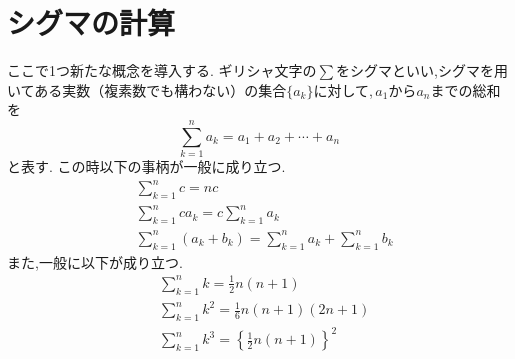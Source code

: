 
\section{シグマの計算}
  ここで1つ新たな概念を導入する.
  ギリシャ文字の$\sum$をシグマといい,シグマを用いてある実数（複素数でも構わない）の集合$\{a_k\}$に対して,\,$a_1$から$a_n$までの総和を
  \[
    \sum_{k=1}^{n} a_k=a_1+a_2+\cdots+ a_n
  \]
  と表す.
  この時以下の事柄が一般に成り立つ.
  \begin{align*}
    &\sum_{k=1}^{n} c=nc\\
    &\sum_{k=1}^{n} ca_k=c\sum_{k=1}^{n} a_k\\
    &\sum_{k=1}^{n} (a_k+b_k)=\sum_{k=1}^{n} a_k+\sum_{k=1}^{n} b_k
  \end{align*}
  また,一般に以下が成り立つ.
  \begin{align*}
    &\sum_{k=1}^{n} k=\frac{1}{2}n(n+1)\\
    &\sum_{k=1}^{n} k^2=\frac{1}{6}n(n+1)(2n+1)\\
    &\sum_{k=1}^{n} k^3=\left\{\frac{1}{2}n(n+1)\right\}^2\\
  \end{align*}


